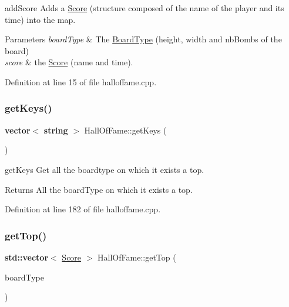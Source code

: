 add\+Score Adds a \hyperlink{class_score}{Score} (structure composed of the name of the player and its time) into the map. 


\begin{DoxyParams}{Parameters}
{\em board\+Type} & The \hyperlink{struct_board_type}{Board\+Type} (height, width and nb\+Bombs of the board) \\
\hline
{\em score} & the \hyperlink{class_score}{Score} (name and time). \\
\hline
\end{DoxyParams}


Definition at line 15 of file halloffame.\+cpp.

\mbox{\label{class_hall_of_fame_aa784fe5d8ace8fb5b2344a06bfb5fb84}} 
\subsubsection{\texorpdfstring{get\+Keys()}{getKeys()}}
{\footnotesize\ttfamily \textbf{ vector}$<$ \textbf{ string} $>$ Hall\+Of\+Fame\+::get\+Keys (\begin{DoxyParamCaption}{ }\end{DoxyParamCaption})}



get\+Keys Get all the boardtype on which it exists a top. 

\begin{DoxyReturn}{Returns}
All the board\+Type on which it exists a top. 
\end{DoxyReturn}


Definition at line 182 of file halloffame.\+cpp.

\mbox{\label{class_hall_of_fame_aa5df9550ea310ad6d72c55c0656213a0}} 
\subsubsection{\texorpdfstring{get\+Top()}{getTop()}\hspace{0.1cm}{\footnotesize\ttfamily [1/2]}}
{\footnotesize\ttfamily \textbf{ std\+::vector}$<$ \hyperlink{class_score}{Score} $>$ Hall\+Of\+Fame\+::get\+Top (\begin{DoxyParamCaption}\item[{const \hyperlink{struct_board_type}{Board\+Type} \&}]{board\+Type }\end{DoxyParamCaption})}



